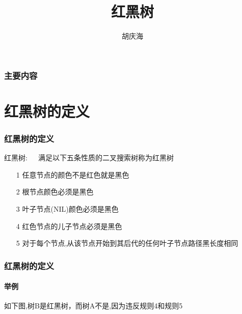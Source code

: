 \documentclass{beamer}
\begin{document}
\begin{CJK}{UTF8}{gbsn}     %

	\title{红黑树}
	\author{胡庆海}
	\date{}

    \begin{frame} %
        \titlepage    %
    \end{frame}


    \begin{frame}
        \frametitle{主要内容}
        \tableofcontents
    \end{frame}

	\section{红黑树的定义}
	\begin{frame}
        \frametitle{红黑树的定义}
        \begin{definition}
            红黑树:\ \ \ 满足以下五条性质的二叉搜索树称为红黑树 \
			\begin{itemize}
				\item[1]  任意节点的颜色不是红色就是黑色
				\item[2]  根节点颜色必须是黑色
				\item[3]  叶子节点(NIL)颜色必须是黑色
				\item[4]  红色节点的儿子节点必须是黑色
				\item[5]  对于每个节点,从该节点开始到其后代的任何叶子节点路径黑长度相同
			\end{itemize}
        \end{definition}
	\end{frame}

	\begin{frame}
        \frametitle{红黑树的定义}
		\framesubtitle{举例}  

		如下图,树B是红黑树，而树A不是,因为违反规则4和规则5
		\pause


\end{frame}
\end{CJK}
\end{document}
